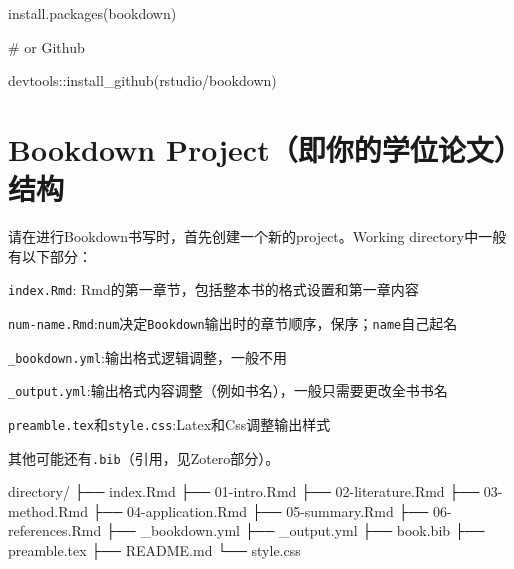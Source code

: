 \documentclass[
  letterpaper,
  DIV=11,
  numbers=noendperiod,
  oneside]{scrreprt}
\newenvironment{Shaded}{}{}
\newcommand{\CommentTok}[1]{\textcolor[rgb]{0.42,0.45,0.49}{#1}}
\newcommand{\DecValTok}[1]{\textcolor[rgb]{0.00,0.36,0.77}{#1}}
\newcommand{\FunctionTok}[1]{\textcolor[rgb]{0.44,0.26,0.76}{#1}}
\newcommand{\NormalTok}[1]{\textcolor[rgb]{0.14,0.16,0.18}{#1}}
\newcommand{\SpecialCharTok}[1]{\textcolor[rgb]{0.00,0.36,0.77}{#1}}
\newcommand{\StringTok}[1]{\textcolor[rgb]{0.01,0.18,0.38}{#1}}
\begin{document}
\begin{Shaded}
\begin{Highlighting}[]
\FunctionTok{install.packages}\NormalTok{(}\StringTok{\textquotesingle{}bookdown\textquotesingle{}}\NormalTok{)}

\CommentTok{\# or Github}

\NormalTok{devtools}\SpecialCharTok{::}\FunctionTok{install\_github}\NormalTok{(}\StringTok{\textquotesingle{}rstudio/bookdown\textquotesingle{}}\NormalTok{)}
\end{Highlighting}
\end{Shaded}

\hypertarget{bookdown-projectux5373ux4f60ux7684ux5b66ux4f4dux8bbaux6587ux7ed3ux6784}{%
\section{Bookdown
Project（即你的学位论文）结构}\label{bookdown-projectux5373ux4f60ux7684ux5b66ux4f4dux8bbaux6587ux7ed3ux6784}}

请在进行Bookdown书写时，首先创建一个新的project。Working
directory中一般有以下部分：

\texttt{index.Rmd}: Rmd的第一章节，包括整本书的格式设置和第一章内容

\texttt{num-name.Rmd}:\texttt{num}决定\texttt{Bookdown}输出时的章节顺序，保序；\texttt{name}自己起名

\texttt{\_bookdown.yml}:输出格式逻辑调整，一般不用

\texttt{\_output.yml}:输出格式内容调整（例如书名），一般只需要更改全书书名

\texttt{preamble.tex}和\texttt{style.css}:Latex和Css调整输出样式

其他可能还有\texttt{.bib}（引用，见Zotero部分）。

\begin{Shaded}
\begin{Highlighting}[]
\NormalTok{directory}\SpecialCharTok{/}
\NormalTok{├──  index.Rmd}
\NormalTok{├── }\DecValTok{01}\SpecialCharTok{{-}}\NormalTok{intro.Rmd}
\NormalTok{├── }\DecValTok{02}\SpecialCharTok{{-}}\NormalTok{literature.Rmd}
\NormalTok{├── }\DecValTok{03}\SpecialCharTok{{-}}\NormalTok{method.Rmd}
\NormalTok{├── }\DecValTok{04}\SpecialCharTok{{-}}\NormalTok{application.Rmd}
\NormalTok{├── }\DecValTok{05}\SpecialCharTok{{-}}\NormalTok{summary.Rmd}
\NormalTok{├── }\DecValTok{06}\SpecialCharTok{{-}}\NormalTok{references.Rmd}
\NormalTok{├── \_bookdown.yml}
\NormalTok{├── \_output.yml}
\NormalTok{├──  book.bib}
\NormalTok{├──  preamble.tex}
\NormalTok{├──  README.md}
\NormalTok{└──  style.css}
\end{Highlighting}
\end{Shaded}
\end{document}
